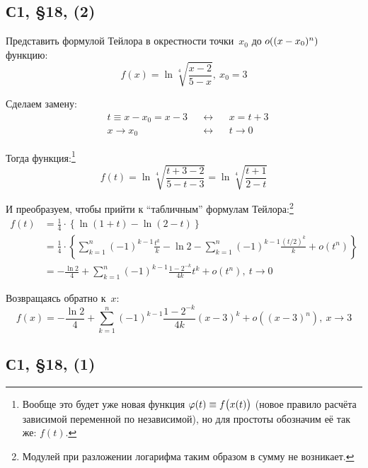 \documentclass[a4paper,12pt]{article}
\begin{document}
  
  
  \subsection{С1, \S 18, (2)}
  
  Представить формулой Тейлора в окрестности точки~$x_0$ до $o((x \hm- x_0)^n)$ функцию:
  \[
    f(x) = \ln{\sqrt[4]{\frac{x - 2}{5 - x}}},\ x_0 = 3
  \]
  
  \begin{solution}
    Сделаем замену:
    \[
      \begin{aligned}
        &t \equiv x - x_0 = x - 3 & &\leftrightarrow & &x = t + 3\\
        &x \to x_0 & &\leftrightarrow & &t \to 0
      \end{aligned}
    \]
    
    Тогда функция:\footnote{
      Вообще это будет уже новая функция $\phi(t) \hm\equiv f\bigl(x(t)\bigr)$ (новое правило расчёта зависимой переменной по независимой), но для простоты обозначим её так же: $f(t)$.
    }
    \[
      f(t) = \ln{\sqrt[4]{\frac{t + 3 - 2}{5 - t - 3}}}
        = \ln{\sqrt[4]{\frac{t + 1}{2 - t}}}
    \]
    
    И преобразуем, чтобы прийти к ``табличным'' формулам Тейлора:\footnote{
      Модулей при разложении логарифма таким образом в сумму не возникает.
    }
    \begin{equation*}
    \begin{split}
      f(t) &= \frac{1}{4} \cdot \left\{
        \ln{(1 + t)} - \ln{(2 - t)}
      \right\}\\
      &= \frac{1}{4} \cdot \left\{
        \sum_{k = 1}^n (-1)^{k - 1} \frac{t^k}{k} - \ln 2 - \sum_{k = 1}^n (-1)^{k - 1} \frac{(t/2)^k}{k} + o(t^n)
      \right\}\\
      &= -\frac{\ln 2}{4} + \sum_{k = 1}^n (-1)^{k - 1} \frac{1 - 2^{-k}}{4k} t^k + o(t^n),\ t \to 0
    \end{split}
    \end{equation*}
    
    Возвращаясь обратно к~$x$:
    \[
      f(x) = -\frac{\ln 2}{4} + \sum_{k = 1}^n (-1)^{k - 1} \frac{1 - 2^{-k}}{4k} (x - 3)^k + o((x - 3)^n),\ x \to 3
    \]
  \end{solution}
  
  
  
  \subsection{С1, \S 18, (1)}
  
\end{document}
